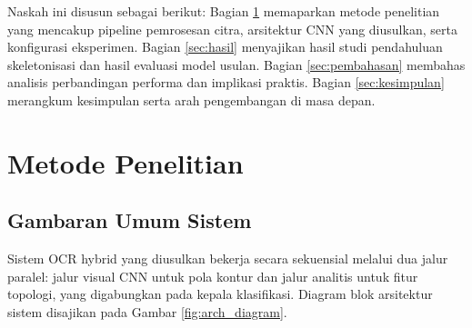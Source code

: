 \documentclass[journal]{IEEEtran}
\begin{document}
Naskah ini disusun sebagai berikut: Bagian \ref{sec:metode} memaparkan metode penelitian yang mencakup pipeline pemrosesan citra, arsitektur CNN yang diusulkan, serta konfigurasi eksperimen. Bagian \ref{sec:hasil} menyajikan hasil studi pendahuluan skeletonisasi dan hasil evaluasi model usulan. Bagian \ref{sec:pembahasan} membahas analisis perbandingan performa dan implikasi praktis. Bagian \ref{sec:kesimpulan} merangkum kesimpulan serta arah pengembangan di masa depan.

\section{Metode Penelitian}
\label{sec:metode}

\subsection{Gambaran Umum Sistem}
Sistem OCR hybrid yang diusulkan bekerja secara sekuensial melalui dua jalur paralel: jalur visual CNN untuk pola kontur dan jalur analitis untuk fitur topologi, yang digabungkan pada kepala klasifikasi. Diagram blok arsitektur sistem disajikan pada Gambar \ref{fig:arch_diagram}. 
\end{document}
